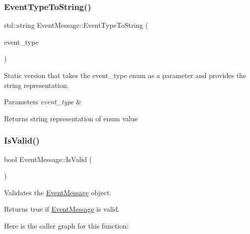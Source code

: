 \subsubsection{\texorpdfstring{Event\+Type\+To\+String()}{EventTypeToString()}\hspace{0.1cm}{\footnotesize\ttfamily [2/2]}}
{\footnotesize\ttfamily std\+::string Event\+Message\+::\+Event\+Type\+To\+String (\begin{DoxyParamCaption}\item[{const \mbox{\hyperlink{classEventMessage_a262da559aa416f176fdda72e8b5113ab}{Event\+Type}} \&}]{event\+\_\+type }\end{DoxyParamCaption})\hspace{0.3cm}{\ttfamily [static]}}



Static version that takes the event\+\_\+type enum as a parameter and provides the string representation. 


\begin{DoxyParams}{Parameters}
{\em event\+\_\+type} & \\
\hline
\end{DoxyParams}
\begin{DoxyReturn}{Returns}
string representation of enum value 
\end{DoxyReturn}
\mbox{\label{classEventMessage_aa5356a869ca843577b6af64f5c1c9297}} 
\subsubsection{\texorpdfstring{Is\+Valid()}{IsValid()}}
{\footnotesize\ttfamily bool Event\+Message\+::\+Is\+Valid (\begin{DoxyParamCaption}{ }\end{DoxyParamCaption})}



Validates the \mbox{\hyperlink{classEventMessage}{Event\+Message}} object. 

\begin{DoxyReturn}{Returns}
true if \mbox{\hyperlink{classEventMessage}{Event\+Message}} is valid. 
\end{DoxyReturn}
Here is the caller graph for this function\+:
\mbox{\label{classEventMessage_ae13342857432d5274f4d86ecc87cb613}} 
